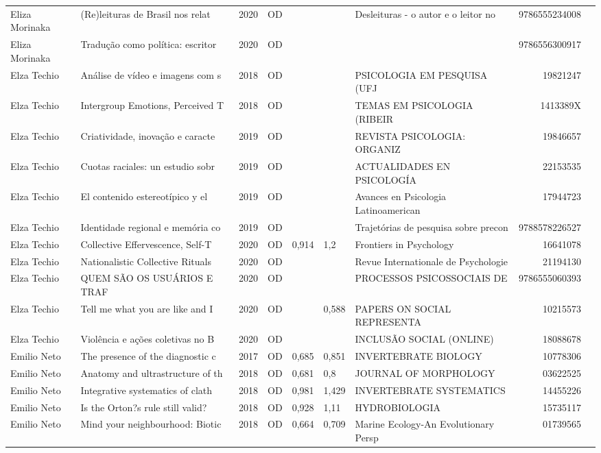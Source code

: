 \documentclass[12pt,brazil]{article}\usepackage[]{graphicx}\usepackage[]{xcolor}
\begin{document}
\begin{longtable}{lllrrllrr}
Eliza Morinaka & (Re)leituras de Brasil nos relat & 2020 & OD &  &  & Desleituras - o autor e o leitor no  & 9786555234008 \\
Eliza Morinaka & Tradução como política: escritor & 2020 & OD &  &  &  & 9786556300917 \\
Elza Techio & Análise de vídeo e imagens com s & 2018 & OD &  &  & PSICOLOGIA EM PESQUISA (UFJ & 19821247 \\
Elza Techio & Intergroup Emotions, Perceived T & 2018 & OD &  &  & TEMAS EM PSICOLOGIA (RIBEIR & 1413389X \\
Elza Techio & Criatividade, inovação e caracte & 2019 & OD &  &  & REVISTA PSICOLOGIA: ORGANIZ & 19846657 \\
Elza Techio & Cuotas raciales: un estudio sobr & 2019 & OD &  &  & ACTUALIDADES EN PSICOLOGÍA & 22153535 \\
Elza Techio & El contenido estereotípico y el  & 2019 & OD &  &  & Avances en Psicologia Latinoamerican & 17944723 \\
Elza Techio & Identidade regional e memória co & 2019 & OD &  &  & Trajetórias de pesquisa sobre precon & 9788578226527 \\
Elza Techio & Collective Effervescence, Self-T & 2020 & OD & 0,914 & 1,2 & Frontiers in Psychology & 16641078 \\
Elza Techio & Nationalistic Collective Rituals & 2020 & OD &  &  & Revue Internationale de Psychologie  & 21194130 \\
Elza Techio & QUEM SÃO OS USUÁRIOS E TRAF & 2020 & OD &  &  & PROCESSOS PSICOSSOCIAIS DE  & 9786555060393 \\
Elza Techio & Tell me what you are like and I  & 2020 & OD &  & 0,588 & PAPERS ON SOCIAL REPRESENTA & 10215573 \\
Elza Techio & Violência e ações coletivas no B & 2020 & OD &  &  & INCLUSÃO SOCIAL (ONLINE) & 18088678 \\
Emilio Neto & The presence of the diagnostic c & 2017 & OD & 0,685 & 0,851 & INVERTEBRATE BIOLOGY & 10778306 \\
Emilio Neto & Anatomy and ultrastructure of th & 2018 & OD & 0,681 & 0,8 & JOURNAL OF MORPHOLOGY & 03622525 \\
Emilio Neto & Integrative systematics of clath & 2018 & OD & 0,981 & 1,429 & INVERTEBRATE SYSTEMATICS & 14455226 \\
Emilio Neto & Is the Orton?s rule still valid? & 2018 & OD & 0,928 & 1,11 & HYDROBIOLOGIA & 15735117 \\
Emilio Neto & Mind your neighbourhood: Biotic  & 2018 & OD & 0,664 & 0,709 & Marine Ecology-An Evolutionary Persp & 01739565 \\

\end{longtable}
\end{document}
